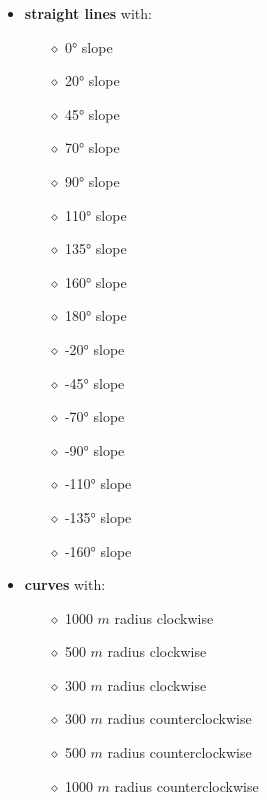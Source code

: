 \begin{itemize}
    \item \textbf{straight lines} with:\begin{multicols}{2} \begin{itemize}
        \item[$\diamond$] 0° slope
        \item[$\diamond$] 20° slope
        \item[$\diamond$] 45° slope
        \item[$\diamond$] 70° slope
        \item[$\diamond$] 90° slope
        \item[$\diamond$] 110° slope
        \item[$\diamond$] 135° slope
        \item[$\diamond$] 160° slope
        \item[$\diamond$] 180° slope
        \item[$\diamond$] -20° slope
        \item[$\diamond$] -45° slope
        \item[$\diamond$] -70° slope
        \item[$\diamond$] -90° slope
        \item[$\diamond$] -110° slope
        \item[$\diamond$] -135° slope
        \item[$\diamond$] -160° slope
    \end{itemize}
    \end{multicols}
    
    \item \textbf{curves} with:
    \begin{multicols}{2} \begin{itemize}
        \item[$\diamond$] 1000 $m$ radius clockwise
        \item[$\diamond$] 500 $m$ radius clockwise
        \item[$\diamond$] 300 $m$ radius clockwise
        \item[$\diamond$] 300 $m$ radius counterclockwise
        \item[$\diamond$] 500 $m$ radius counterclockwise
        \item[$\diamond$] 1000 $m$ radius counterclockwise
    \end{itemize}
    \end{multicols}
\end{itemize}

